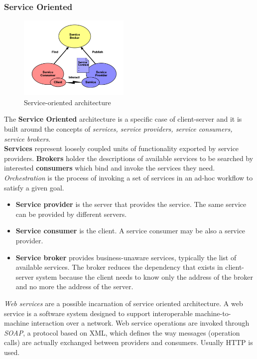 \documentclass[10pt,a4paper]{article}
\begin{document}
\subsubsection{Service Oriented}
 \begin{figure}[h!]
 \hfill \includegraphics[width=150pt]{images/service-oriented.png}\hspace*{\fill}
  \caption{Service-oriented architecture}
  \label{fig:fsa1}
\end{figure}
The \textbf{Service Oriented} architecture is a specific case of client-server and it is built around the concepts of \textit{services, service providers, service consumers, service brokers}. \\ \textbf{Services} represent loosely coupled units of functionality exported by service providers. \textbf{Brokers} holder the descriptions of available services to be searched by interested \textbf{consumers} which bind and invoke the services they need. \textit{Orchestration} is the process of invoking a set of services in an ad-hoc workflow to satisfy a given goal.
\begin{itemize}
	\item \textbf{Service provider} is the server that provides the service. The same service can be provided by different servers.
	\item \textbf{Service consumer} is the client. A service consumer may be also a service provider.
	\item \textbf{Service broker} provides business-unaware services, typically the list of available services. The broker reduces the dependency that exists in client-server system because the client needs to know only the address of the broker and no more the address of the server.
\end{itemize}
\textit{Web services} are a possible incarnation of service oriented architecture. A web service is a software system designed to support interoperable machine-to-machine interaction over a network. Web service operations are invoked through \textit{SOAP}, a protocol based on XML, which defines the way messages (operation calls) are actually exchanged between providers and consumers. Usually HTTP is used.
\end{document}
